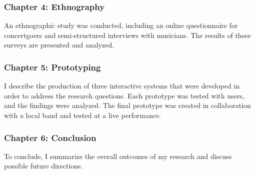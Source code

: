 \subsubsection{Chapter 4: Ethnography}

An ethnographic study was conducted, including an online questionnaire for concertgoers and semi-structured interviews with musicians. The results of these surveys are presented and analyzed.
	
\subsubsection{Chapter 5: Prototyping}

I describe the production of three interactive systems that were developed in order to address the research questions. Each prototype was tested with users, and the findings were analyzed. The final prototype was created in collaboration with a local band and tested at a live performance.
		
\subsubsection{Chapter 6: Conclusion}
	
To conclude, I summarize the overall outcomes of my research and discuss possible future directions.